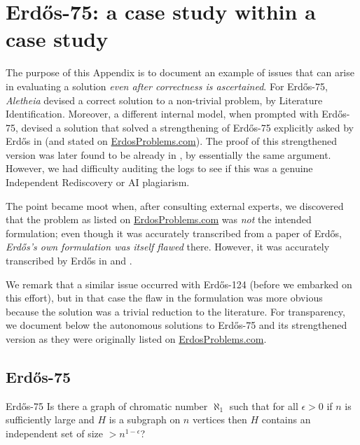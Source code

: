 \documentclass{article}
\theoremstyle{plain}
\theoremstyle{definition}
\newcommand{\Aletheia}{\emph{Aletheia}}
\begin{document}
\appendix

\section{Erd\H{o}s-75: a case study within a case study}\label{app:75}

The purpose of this Appendix is to document an example of issues that can arise in evaluating a solution \emph{even after correctness is ascertained}. For Erd\H{o}s-75, {\Aletheia} devised a correct solution to a non-trivial problem, by Literature Identification. Moreover, a different internal model, when prompted with Erd\H{o}s-75, devised a solution that solved a strengthening of Erd\H{o}s-75 explicitly asked by Erd\H{o}s in \cite{Erd95} (and stated on \href{https://www.erdosproblems.com/}{\ttfamily ErdosProblems.com}). The proof of this strengthened version was later found to be already in \cite{EHS82}, by essentially the same argument. However, we had difficulty auditing the logs to see if this was a genuine Independent Rediscovery or AI plagiarism. 

The point became moot when, after consulting external experts, we discovered that the problem as listed on \href{https://www.erdosproblems.com/}{\ttfamily ErdosProblems.com} was \emph{not} the intended formulation; even though it was accurately transcribed from a paper \cite{Erd95} of Erd\H{o}s, \emph{Erd\H{o}s's own formulation was itself flawed} there. However, it was accurately transcribed by Erd\H{o}s in 
\cite{EHS82} and \cite{Erd95d}. 

We remark that a similar issue occurred with Erd\H{o}s-124 (before we embarked on this effort), but in that case the flaw in the formulation was more obvious because the solution was a trivial reduction to the literature. For transparency, we document below the autonomous solutions to Erd\H{o}s-75 and its strengthened version as they were originally listed on \href{https://www.erdosproblems.com/}{\ttfamily ErdosProblems.com}. 

\subsection{Erd\H{o}s-75}


\begin{problem}{Erd\H{o}s-75 \cite{EHS82, Erd95, Erd95d}}
    Is there a graph of chromatic number $\aleph_1$ such that for all $\epsilon > 0$ if $n$ is sufficiently large and $H$ is a subgraph on $n$ vertices then $H$ contains an independent set of size $> n^{1-\epsilon}$?
\end{problem}
\end{document}
